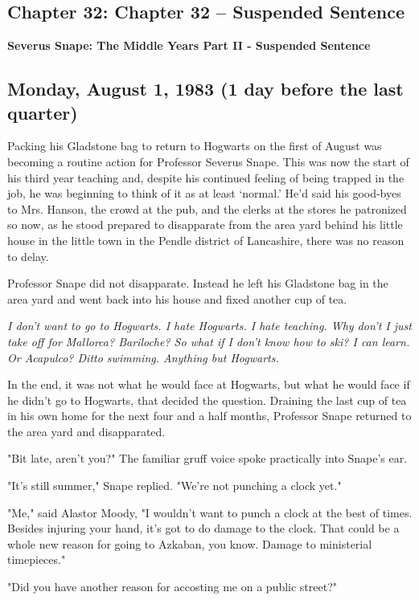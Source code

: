 \documentclass[a4paper,11pt]{article}
\begin{document}
\subsection{Chapter 32: Chapter 32 – Suspended Sentence}

\textbf{Severus Snape: The Middle Years Part II - Suspended Sentence}

\subsection{Monday, August 1, 1983 (1 day before the last quarter)}

Packing his Gladstone bag to return to Hogwarts on the first of August was becoming a routine action for Professor Severus Snape. This was now the start of his third year teaching and, despite his continued feeling of being trapped in the job, he was beginning to think of it as at least `normal.' He'd said his good-byes to Mrs. Hanson, the crowd at the pub, and the clerks at the stores he patronized so now, as he stood prepared to disapparate from the area yard behind his little house in the little town in the Pendle district of Lancashire, there was no reason to delay.

Professor Snape did not disapparate. Instead he left his Gladstone bag in the area yard and went back into his house and fixed another cup of tea.

\emph{I don't want to go to Hogwarts. I hate Hogwarts. I hate teaching. Why don't I just take off for Mallorca? Bariloche? So what if I don't know how to ski? I can learn. Or Acapulco? Ditto swimming. Anything but Hogwarts.}

In the end, it was not what he would face at Hogwarts, but what he would face if he didn't go to Hogwarts, that decided the question. Draining the last cup of tea in his own home for the next four and a half months, Professor Snape returned to the area yard and disapparated.

"Bit late, aren't you?" The familiar gruff voice spoke practically into Snape's ear.

"It's still summer," Snape replied. "We're not punching a clock yet."

"Me," said Alastor Moody, "I wouldn't want to punch a clock at the best of times. Besides injuring your hand, it's got to do damage to the clock. That could be a whole new reason for going to Azkaban, you know. Damage to ministerial timepieces."

"Did you have another reason for accosting me on a public street?"
\end{document}

